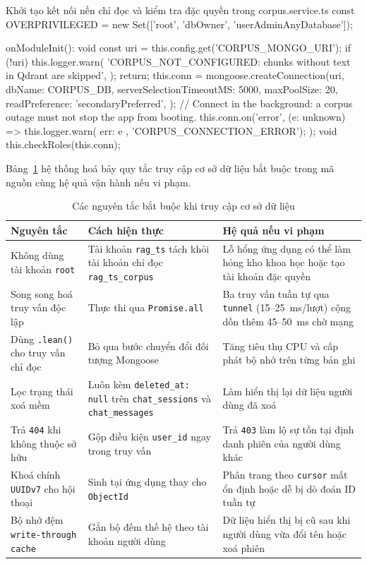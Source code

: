 \begin{tsbox}{Khởi tạo kết nối nền chỉ đọc và kiểm tra đặc quyền trong corpus.service.ts}
const OVERPRIVILEGED = new Set(['root', 'dbOwner', 'userAdminAnyDatabase']);

onModuleInit(): void {
  const uri = this.config.get('CORPUS_MONGO_URI');
  if (!uri) {
    this.logger.warn(
      'CORPUS_NOT_CONFIGURED: chunks without text in Qdrant are skipped',
    );
    return;
  }
  this.conn = mongoose.createConnection(uri, {
    dbName: CORPUS_DB,
    serverSelectionTimeoutMS: 5000,
    maxPoolSize: 20,
    readPreference: 'secondaryPreferred',
  });
  // Connect in the background: a corpus outage must not stop the app from booting.
  this.conn.on('error', (e: unknown) => {
    this.logger.warn({ err: e }, 'CORPUS_CONNECTION_ERROR');
  });
  void this.checkRoles(this.conn);
}
\end{tsbox}

Bảng~\ref{tab:nguyen-tac-truy-cap-csdl} hệ thống hoá bảy quy tắc truy cập cơ sở dữ liệu bắt buộc trong mã nguồn cùng hệ quả vận hành nếu vi phạm.

\begin{table}[htbp]
\centering
\caption{Các nguyên tắc bắt buộc khi truy cập cơ sở dữ liệu}
\label{tab:nguyen-tac-truy-cap-csdl}
\footnotesize
\setlength{\tabcolsep}{4pt}
\begin{tabularx}{\textwidth}{
  >{\raggedright\arraybackslash}p{3.6cm}
  >{\raggedright\arraybackslash}p{4.8cm}
  >{\raggedright\arraybackslash}X
}
\toprule
\textbf{Nguyên tắc} & \textbf{Cách hiện thực} & \textbf{Hệ quả nếu vi phạm} \\
\midrule
Không dùng tài khoản \texttt{root} & Tài khoản \texttt{rag\_ts} tách khỏi tài khoản chỉ đọc \texttt{rag\_ts\_corpus} & Lỗ hổng ứng dụng có thể làm hỏng kho khoa học hoặc tạo tài khoản đặc quyền \\
\midrule
Song song hoá truy vấn độc lập & Thực thi qua \texttt{Promise.all} & Ba truy vấn tuần tự qua \texttt{tunnel} (15--25~ms/lượt) cộng dồn thêm 45--50~ms chờ mạng \\
\midrule
Dùng \texttt{.lean()} cho truy vấn chỉ đọc & Bỏ qua bước chuyển đổi đối tượng Mongoose & Tăng tiêu thụ CPU và cấp phát bộ nhớ trên từng bản ghi \\
\midrule
Lọc trạng thái xoá mềm & Luôn kèm \texttt{deleted\_\allowbreak{}at:\allowbreak{} null} trên \texttt{chat\_sessions} và \texttt{chat\_messages} & Làm hiển thị lại dữ liệu người dùng đã xoá \\
\midrule
Trả \texttt{404} khi không thuộc sở hữu & Gộp điều kiện \texttt{user\_id} ngay trong truy vấn & Trả \texttt{403} làm lộ sự tồn tại định danh phiên của người dùng khác \\
\midrule
Khoá chính \texttt{UUIDv7} cho hội thoại & Sinh tại ứng dụng thay cho \texttt{ObjectId} & Phân trang theo \texttt{cursor} mất ổn định hoặc dễ bị dò đoán ID tuần tự \\
\midrule
Bộ nhớ đệm \texttt{write-through cache} & Gắn bộ đếm thế hệ theo tài khoản người dùng & Dữ liệu hiển thị bị cũ sau khi người dùng vừa đổi tên hoặc xoá phiên \\
\bottomrule
\end{tabularx}
\end{table}

